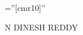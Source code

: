 \documentclass[7pt]{article}
\begin{document}

\pagestyle{empty} %

\font\fb=''[cmr10]'' %

\par{\centering
		{\Huge N DINESH \textsc{REDDY}
	}\bigskip\par}
%
\end{document}
